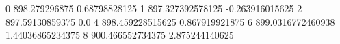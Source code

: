0 898.279296875 0.68798828125
1 897.327392578125 -0.263916015625
2 897.59130859375 0.0
4 898.459228515625 0.867919921875
6 899.0316772460938 1.44036865234375
8 900.466552734375 2.875244140625

